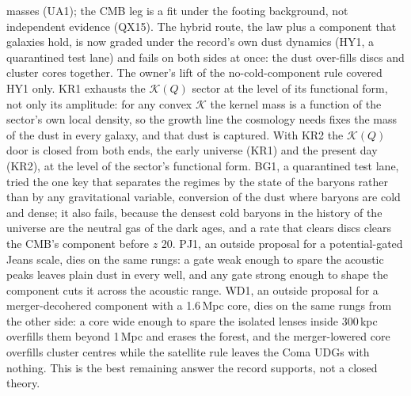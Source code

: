\documentclass[10pt]{article}
\begin{document}
masses (UA1); the CMB leg is a fit under the footing background, not independent evidence (QX15).
The hybrid route, the law plus a component that galaxies hold, is now graded under the record's own dust dynamics (HY1, a quarantined test lane) and fails on both sides at once: the dust over-fills discs and cluster cores together. The owner's lift of the no-cold-component rule covered HY1 only.
KR1 exhausts the $\mathcal K(Q)$ sector at the level of its functional form, not only its amplitude: for any convex $\mathcal K$ the kernel mass is a function of the sector's own local density, so the growth line the cosmology needs fixes the mass of the dust in every galaxy, and that dust is captured.
With KR2 the $\mathcal K(Q)$ door is closed from both ends, the early universe (KR1) and the present day (KR2), at the level of the sector's functional form.
BG1, a quarantined test lane, tried the one key that separates the regimes by the state of the baryons rather than by any gravitational variable, conversion of the dust where baryons are cold and dense; it also fails, because the densest cold baryons in the history of the universe are the neutral gas of the dark ages, and a rate that clears discs clears the CMB's component before $z$ 20. PJ1, an outside proposal for a potential-gated Jeans scale, dies on the same rungs: a gate weak enough to spare the acoustic peaks leaves plain dust in every well, and any gate strong enough to shape the component cuts it across the acoustic range. WD1, an outside proposal for a merger-decohered component with a 1.6\,Mpc core, dies on the same rungs from the other side: a core wide enough to spare the isolated lenses inside 300\,kpc overfills them beyond 1\,Mpc and erases the forest, and the merger-lowered core overfills cluster centres while the satellite rule leaves the Coma UDGs with nothing.
This is the best remaining answer the record supports, not a closed theory.
\end{document}
